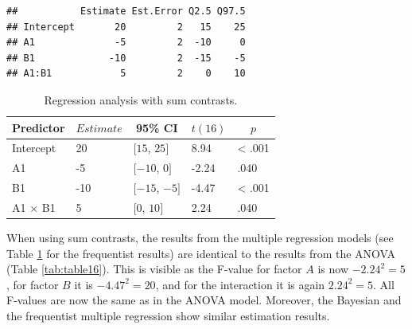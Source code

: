 \documentclass[12pt,]{krantz}
\newenvironment{Shaded}{\begin{snugshade}}{\end{snugshade}}
\newcommand{\KeywordTok}[1]{\textcolor[rgb]{0.13,0.29,0.53}{\textbf{#1}}}
\newcommand{\DataTypeTok}[1]{\textcolor[rgb]{0.13,0.29,0.53}{#1}}
\newcommand{\DecValTok}[1]{\textcolor[rgb]{0.00,0.00,0.81}{#1}}
\newcommand{\StringTok}[1]{\textcolor[rgb]{0.31,0.60,0.02}{#1}}
\newcommand{\OperatorTok}[1]{\textcolor[rgb]{0.81,0.36,0.00}{\textbf{#1}}}
\newcommand{\NormalTok}[1]{#1}
\theoremstyle{definition}
\theoremstyle{definition}
\theoremstyle{definition}
\theoremstyle{remark}
\begin{document}
\begin{verbatim}
##           Estimate Est.Error Q2.5 Q97.5
## Intercept       20         2   15    25
## A1              -5         2  -10     0
## B1             -10         2  -15    -5
## A1:B1            5         2    0    10
\end{verbatim}

\begin{Shaded}
\end{Shaded}

\begin{table}[h]

\begin{center}
\begin{threeparttable}

\caption{\label{tab:table18}Regression analysis with sum contrasts.}

\begin{tabular}{lllll}
\toprule
Predictor & \multicolumn{1}{c}{$Estimate$} & \multicolumn{1}{c}{95\% CI} & \multicolumn{1}{c}{$t(16)$} & \multicolumn{1}{c}{$p$}\\
\midrule
Intercept & 20 & $[15$, $25]$ & 8.94 & < .001\\
A1 & -5 & $[-10$, $0]$ & -2.24 & .040\\
B1 & -10 & $[-15$, $-5]$ & -4.47 & < .001\\
A1 $\times$ B1 & 5 & $[0$, $10]$ & 2.24 & .040\\
\bottomrule
\end{tabular}

\end{threeparttable}
\end{center}

\end{table}

When using sum contrasts, the results from the multiple regression
models (see Table \ref{tab:table18} for the frequentist results) are
identical to the results from the ANOVA (Table \ref{tab:table16}). This
is visible as the F-value for factor \(A\) is now \(-2.24^2 = 5\), for
factor \(B\) it is \(-4.47^2 = 20\), and for the interaction it is again
\(2.24^2 = 5\). All F-values are now the same as in the ANOVA model.
Moreover, the Bayesian and the frequentist multiple regression show
similar estimation results.
\end{document}
